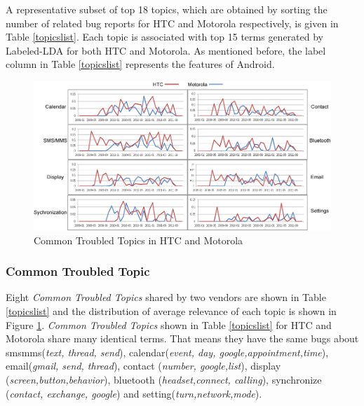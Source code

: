 \documentclass[10pt, conference, compsocconf]{IEEEtran}
\begin{document}
A representative subset of top 18 topics, which are obtained by
sorting the number of related bug reports for HTC and Motorola
respectively, is given in Table \ref{topicslist}.
Each topic is associated with top 15 terms generated by Labeled-LDA for
both HTC and Motorola. 
As mentioned before, the label column in Table \ref{topicslist} represents the features of Android. %

\begin{figure}[htb]
\centering
\includegraphics[width=1\textwidth]{commontopic.png}
\caption{Common Troubled Topics in HTC and Motorola}
\label{commontopic}
\end{figure}

\subsubsection{Common Troubled Topic} 
Eight \textit{Common Troubled Topics} shared by two vendors are shown in Table \ref{topicslist} and the distribution of average relevance of each topic is shown in Figure \ref{commontopic}. 
\textit{Common Troubled Topics} shown in Table \ref{topicslist} for HTC and Motorola share many identical terms. That means they have the same bugs about sms\/mms(\textit{text, thread, send}), calendar(\textit{event, day, google,appointment,time}), email(\textit{gmail, send, thread}), contact (\textit{number, google,list}), display (\textit{screen,button,behavior}), bluetooth (\textit{headset,connect, calling}), synchronize (\textit{contact, exchange, google}) and setting(\textit{turn,network,mode}). 
\end{document}
